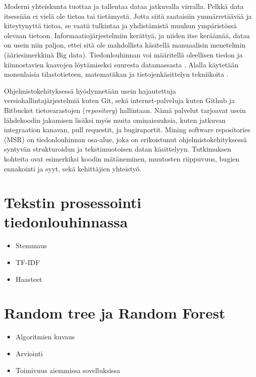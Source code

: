 \documentclass[utf8]{gradu3}
\begin{document}
Moderni yhteiskunta tuottaa ja tallentaa dataa jatkuvalla virralla. Pelkkä data
itsessään ei vielä ole tietoa tai tietämystä. Jotta siitä saataisiin
ymmärretäävää ja kiteytynyttä tietoa, se vaatii tulkintaa ja yhdistämistä muuhun
ympäristössä olevaan tietoon. %
Informaatiojärjestelmiin kerättyä, ja niiden itse keräämää, dataa on usein niin
paljon, ettei sitä ole mahdollista käsitellä manuaalisin menetelmin
(ääriesimerkkinä Big data). Tiedonlouhinnan voi määritellä oleellisen tiedon ja
kiinnostavien kaavojen löytämiseksi suuresta datamassasta
\parencite[][8]{han-data_mining}. Alalla käytetään monenlaisia tilastotieteen,
matematiikan ja tietojenkäsittelyn tekniikoita \parencite{clifton-2019}.

Ohjelmistokehityksessä hyödynnetään usein hajautettuja
versiohallintajärjestelmiä kuten Git, sekä internet-palveluja kuten Github ja
Bitbucket tietovarastojen (\textit{repository}) hallintaan. Nämä palvelut
tarjoavat usein lähdekoodin jakamisen lisäksi myös muita ominaisuuksia, kuten
jatkuvan integraation kanavan, pull requestit, ja bugiraportit. Mining software
repositories (MSR) on tiedonlouhinnan osa-alue, joka on erikoistunut
ohjelmistokehityksessä syntyvän strukturoidun ja tekstimuotoisen datan
käsittelyyn. Tutkimuksen kohteita ovat esimerkiksi koodin mätäneminen, muutosten
riippuvuus, bugien ennakointi ja syyt, sekä kehittäjien yhteistyö.
\parencite{guemes-pena-emerging_topics}

\section{Tekstin prosessointi tiedonlouhinnassa}
\begin{itemize}
  \item Stemmaus
  \item TF-IDF
  \item Haasteet
\end{itemize}
\section{Random tree ja Random Forest}
\begin{itemize}
  \item Algoritmien kuvaus
  \item Arviointi
  \item Toimivuus aiemmissa sovelluksissa
\end{itemize}
\end{document}
